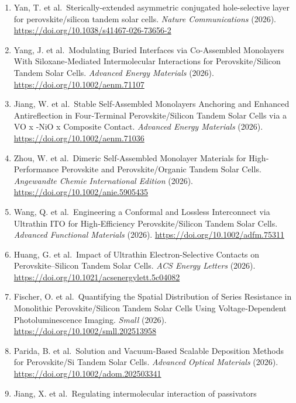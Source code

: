 \documentclass[
  11pt,
]{article}
\begin{document}
\begin{enumerate}
  Luo, M. et al.~Uniform and ordered self-assembled hole-selective
  layers driven by π-π interactions for efficient perovskite-silicon
  tandem solar cells. \emph{Nature Communications} (2026).
  \url{https://doi.org/10.1038/s41467-026-72160-x}
\item
  Yan, T. et al.~Sterically-extended asymmetric conjugated
  hole-selective layer for perovskite/silicon tandem solar cells.
  \emph{Nature Communications} (2026).
  \url{https://doi.org/10.1038/s41467-026-73656-2}
\item
  Yang, J. et al.~Modulating Buried Interfaces via Co‐Assembled
  Monolayers With Siloxane‐Mediated Intermolecular Interactions for
  Perovskite/Silicon Tandem Solar Cells. \emph{Advanced Energy
  Materials} (2026). \url{https://doi.org/10.1002/aenm.71107}
\item
  Jiang, W. et al.~Stable Self‐Assembled Monolayers Anchoring and
  Enhanced Antireflection in Four‐Terminal Perovskite/Silicon Tandem
  Solar Cells via a VO x ‐NiO x Composite Contact. \emph{Advanced Energy
  Materials} (2026). \url{https://doi.org/10.1002/aenm.71036}
\item
  Zhou, W. et al.~Dimeric Self‐Assembled Monolayer Materials for
  High‐Performance Perovskite and Perovskite/Organic Tandem Solar Cells.
  \emph{Angewandte Chemie International Edition} (2026).
  \url{https://doi.org/10.1002/anie.5905435}
\item
  Wang, Q. et al.~Engineering a Conformal and Lossless Interconnect via
  Ultrathin ITO for High‐Efficiency Perovskite/Silicon Tandem Solar
  Cells. \emph{Advanced Functional Materials} (2026).
  \url{https://doi.org/10.1002/adfm.75311}
\item
  Huang, G. et al.~Impact of Ultrathin Electron-Selective Contacts on
  Perovskite--Silicon Tandem Solar Cells. \emph{ACS Energy Letters}
  (2026). \url{https://doi.org/10.1021/acsenergylett.5c04082}
\item
  Fischer, O. et al.~Quantifying the Spatial Distribution of Series
  Resistance in Monolithic Perovskite/Silicon Tandem Solar Cells Using
  Voltage‐Dependent Photoluminescence Imaging. \emph{Small} (2026).
  \url{https://doi.org/10.1002/smll.202513958}
\item
  Parida, B. et al.~Solution and Vacuum‐Based Scalable Deposition
  Methods for Perovskite/Si Tandem Solar Cells. \emph{Advanced Optical
  Materials} (2026). \url{https://doi.org/10.1002/adom.202503341}
\item
  Jiang, X. et al.~Regulating intermolecular interaction of passivators

\end{enumerate}
\end{document}
